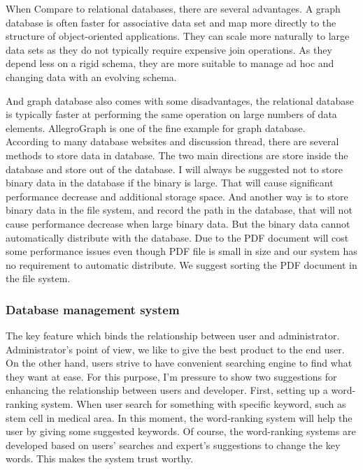 When Compare to relational databases, there are several advantages. A graph database is often faster for associative data set and map more directly to the structure of object-oriented applications. They can scale more naturally to large data sets as they do not typically require expensive join operations. As they depend less on a rigid schema, they are more suitable to manage ad hoc and changing data with an evolving schema.

And graph database also comes with some disadvantages, the relational database is typically faster at performing the same operation on large numbers of data elements. AllegroGraph is one of the fine example for graph database. \\

According to many database websites and discussion thread, there are several methods to store data in database. The two main directions are store inside the database and store out of the database. I will always be suggested not to store binary data in the database if the binary is large. That will cause significant performance decrease and additional storage space. And another way is to store binary data in the file system, and record the path in the database, that will not cause performance decrease when large binary data. But the binary data cannot automatically distribute with the database. Due to the PDF document will cost some performance issues even though PDF file is small in size and our system has no requirement to automatic distribute. We suggest sorting the PDF document in the file system.

\subsubsection*{Database management system}
The key feature which binds the relationship between user and administrator. Administrator's point of view, we like to give the best product to the end user. On the other hand, users strive to have convenient searching engine to find what they want at ease. For this purpose, I'm pressure to show two suggestions for enhancing the relationship between users and developer. First, setting up a word-ranking system. When user search for something with specific keyword, such as stem cell in medical area. In this moment, the word-ranking system will help the user by giving some suggested keywords. Of course, the word-ranking systems are developed based on users' searches and expert's suggestions to change the key words. This makes the system trust worthy.
 
